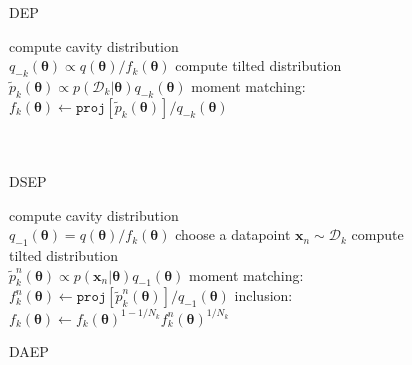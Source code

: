 \documentclass{article} %
\begin{document}
\begin{figure}[!t]
\begin{minipage}[t]{0.33\linewidth}
\centering
\begin{algorithm}[H] 
\caption{DEP} \small
\label{alg:dep} 
\begin{algorithmic}[1]
	\STATE compute cavity distribution \\$q_{-k}(\bm{\theta}) \propto q(\bm{\theta}) / f_k(\bm{\theta})$ 
	\STATE compute tilted distribution \\$\tilde{p}_k(\bm{\theta}) \propto p(\mathcal{D}_k|\bm{\theta}) q_{-k}(\bm{\theta})$
	\STATE moment matching: \\ \hspace{-3mm}$f_k(\bm{\theta}) \leftarrow \mathtt{proj}[\tilde{p}_k(\bm{\theta})] / q_{-k}(\bm{\theta}) $ \\
\hspace{1mm}\\ \vspace{4.3mm} \hspace{1mm}\\
\end{algorithmic}
\end{algorithm}
\end{minipage}
%
\begin{minipage}[t]{0.33\linewidth}
\centering
\begin{algorithm}[H] 
\caption{DSEP} \small
\label{alg:dsep} 
\begin{algorithmic}[1] 
	\STATE compute cavity distribution \\$q_{-1}(\bm{\theta}) = q(\bm{\theta}) / f_k(\bm{\theta})$
	\STATE choose a datapoint $\bm{x}_n \sim \mathcal{D}_k$
	\STATE compute tilted distribution \\$\tilde{p}_k^n(\bm{\theta}) \propto p(\bm{x}_n|\bm{\theta}) q_{-1}(\bm{\theta})$
	\STATE moment matching: \\ \hspace{-1mm}$f_k^n(\bm{\theta}) \leftarrow \mathtt{proj}[\tilde{p}_k^n(\bm{\theta})] / q_{-1}(\bm{\theta}) $
	\STATE inclusion:\\ \hspace{-5mm} $f_k(\bm{\theta}) \leftarrow f_k(\bm{\theta})^{1 - 1/N_k} f_k^n(\bm{\theta})^{1/N_k}$
\end{algorithmic}
\end{algorithm}
\end{minipage}
\begin{minipage}[t]{0.33\linewidth}
\centering
\begin{algorithm}[H]
\caption{DAEP} \small
\label{alg:daep} 
\begin{algorithmic}[1] 


\end{algorithmic}
\end{algorithm}
\end{minipage}
\end{figure}
\end{document}
